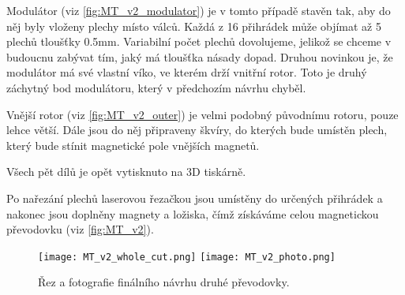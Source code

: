 Modulátor (viz \autoref{fig:MT_v2_modulator}) je v tomto případě stavěn tak, aby do něj byly vloženy plechy místo válců. Každá z 16 přihrádek může objímat až 5 plechů tloušťky 0.5mm. Variabilní počet plechů dovolujeme, jelikož se chceme v budoucnu zabývat tím, jaký má tloušťka násady dopad. Druhou novinkou je, že modulátor má své vlastní víko, ve kterém drží vnitřní rotor. Toto je druhý záchytný bod modulátoru, který v předchozím návrhu chyběl.

Vnější rotor (viz \autoref{fig:MT_v2_outer}) je velmi podobný původnímu rotoru, pouze lehce větší. Dále jsou do něj připraveny škvíry, do kterých bude umístěn plech, který bude stínit magnetické pole vnějších magnetů.

\clearpage
{
    Všech pět dílů je opět vytisknuto na 3D tiskárně. 
    \raggedright
    Po nařezání plechů laserovou řezačkou jsou umístěny do určených přihrádek a nakonec jsou doplněny magnety a ložiska, čímž získáváme celou magnetickou převodovku (viz \autoref{fig:MT_v2}).
}

\begin{figure}[H]
    \texttt{[image: MT\_v2\_whole\_cut.png]}
    \texttt{[image: MT\_v2\_photo.png]}
    \centering
    \caption{Řez a fotografie finálního návrhu druhé převodovky.}
    \label{fig:MT_v2}
\end{figure}


